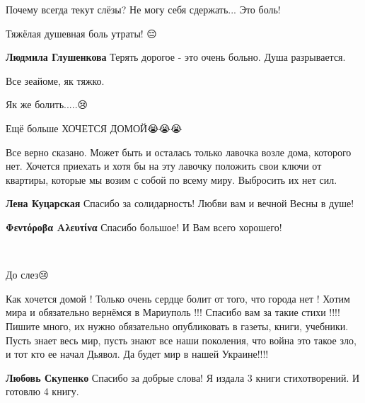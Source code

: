 
Почему всегда текут слёзы? Не могу себя сдержать... Это боль!

Тяжёлая душевная боль утраты! 😔

\begin{itemize} %
\textbf{Людмила Глушенкова} Терять дорогое - это очень больно. Душа разрывается.
\end{itemize} %


Все зеайоме, як тяжко.


Як же болить.....😢


Ещё больше ХОЧЕТСЯ ДОМОЙ😭😭😭


Все верно сказано. Может быть и осталась только лавочка возле дома, которого
нет. Хочется приехать и хотя бы на эту лавочку положить свои ключи от квартиры,
которые мы возим с собой по всему миру. Выбросить их нет сил.

\begin{itemize} %
\textbf{Лена Куцарская} Спасибо за солидарность! Любви вам и вечной Весны в душе!

\textbf{Φεντόροβα Αλευτίνα} Спасибо большое! И Вам всего хорошего!
\end{itemize} %

🤦

До слез😢


Как хочется домой ! Только очень сердце болит от того, что города нет ! Хотим
мира и обязательно вернёмся в Мариуполь !!! Спасибо вам за такие стихи !!!!
Пишите много, их нужно обязательно опубликовать в газеты, книги, учебники. Пусть
знает весь мир, пусть знают все наши поколения, что война это такое зло, и тот
кто ее начал Дьявол. Да будет мир в нашей Украине!!!!

\begin{itemize} %
\textbf{Любовь Скупенко} Спасибо за добрые слова! Я издала 3 книги стихотворений. И готовлю 4 книгу.
\end{itemize} %
